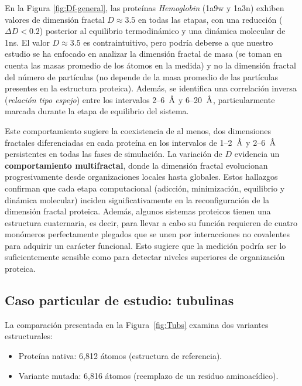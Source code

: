 	\clearpage
	
	
	En la Figura \ref{fig:Df-general}, las prote\'{i}nas \textit{Hemoglobin} (1a9w y 1a3n) exhiben valores de dimensi\'{o}n fractal $D \approx 3.5$ en todas las etapas, con una reducci\'{o}n  ($\Delta D < 0.2$) posterior al equilibrio termodin\'{a}mico y una din\'{a}mica molecular de 1ns. El valor $D \approx 3.5$  es contraintuitivo, pero podr\'{i}a deberse a que nuestro estudio se ha enfocado en analizar la dimensi\'{o}n fractal de masa (se toman en cuenta las masas promedio de los \'{a}tomos en la medida) y no la dimensi\'{o}n fractal del número de part\'{i}culas (no depende de la masa promedio de las part\'{i}culas presentes en la estructura proteica). Adem\'{a}s, se identifica una correlaci\'{o}n inversa (\emph{relaci\'{o}n tipo espejo}) entre los intervalos 2--6~$\textup{\r{A}}$ y 6--20~$\textup{\r{A}}$, particularmente marcada durante la etapa de equilibrio del sistema.
	
	Este comportamiento sugiere la coexistencia de al menos, dos dimensiones fractales diferenciadas en cada prote\'{i}na en los intervalos de 1--2~$\textup{\r{A}}$ y 2--6~$\textup{\r{A}}$ persistentes en todas las fases de simulaci\'{o}n. La variaci\'{o}n de $D$ evidencia un \textbf{comportamiento multifractal}, donde la dimensi\'{o}n fractal evolucionan progresivamente desde organizaciones locales hasta globales. Estos hallazgos confirman que cada etapa computacional (adicci\'{o}n, minimizaci\'{o}n, equilibrio y din\'{a}mica molecular) inciden significativamente en la reconfiguraci\'{o}n de la dimensi\'{o}n fractal proteica. Adem\'{a}s, algunos sistemas proteicos tienen una estructura cuaternaria, es decir, para llevar a cabo su función requieren de cuatro mon\'{o}meros perfectamente plegados que se unen por interacciones no covalentes para adquirir un car\'{a}cter funcional. Esto sugiere que la medición podría ser lo suficientemente sensible como para detectar niveles superiores de organización proteica.
	
	
	
	
	\subsection*{Caso particular de estudio: tubulinas}
	
	La comparaci\'{o}n presentada en la Figura~\ref{fig:Tubs} examina dos variantes estructurales:
	\begin{itemize}
		\item Prote\'{i}na nativa: 6,812 \'{a}tomos (estructura de referencia).
		\item Variante mutada: 6,816 \'{a}tomos (reemplazo de un residuo aminoac\'{i}dico).
	\end{itemize}
	
